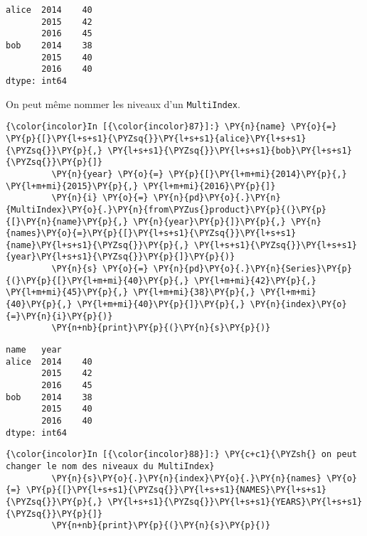     \begin{Verbatim}[commandchars=\\\{\},frame=single,framerule=0.3mm,rulecolor=\color{cellframecolor}]
alice  2014    40
       2015    42
       2016    45
bob    2014    38
       2015    40
       2016    40
dtype: int64
\end{Verbatim}

    On peut même nommer les niveaux d'un \texttt{MultiIndex}.

    \begin{Verbatim}[commandchars=\\\{\},frame=single,framerule=0.3mm,rulecolor=\color{cellframecolor}]
{\color{incolor}In [{\color{incolor}87}]:} \PY{n}{name} \PY{o}{=} \PY{p}{[}\PY{l+s+s1}{\PYZsq{}}\PY{l+s+s1}{alice}\PY{l+s+s1}{\PYZsq{}}\PY{p}{,} \PY{l+s+s1}{\PYZsq{}}\PY{l+s+s1}{bob}\PY{l+s+s1}{\PYZsq{}}\PY{p}{]}
         \PY{n}{year} \PY{o}{=} \PY{p}{[}\PY{l+m+mi}{2014}\PY{p}{,} \PY{l+m+mi}{2015}\PY{p}{,} \PY{l+m+mi}{2016}\PY{p}{]}
         \PY{n}{i} \PY{o}{=} \PY{n}{pd}\PY{o}{.}\PY{n}{MultiIndex}\PY{o}{.}\PY{n}{from\PYZus{}product}\PY{p}{(}\PY{p}{[}\PY{n}{name}\PY{p}{,} \PY{n}{year}\PY{p}{]}\PY{p}{,} \PY{n}{names}\PY{o}{=}\PY{p}{[}\PY{l+s+s1}{\PYZsq{}}\PY{l+s+s1}{name}\PY{l+s+s1}{\PYZsq{}}\PY{p}{,} \PY{l+s+s1}{\PYZsq{}}\PY{l+s+s1}{year}\PY{l+s+s1}{\PYZsq{}}\PY{p}{]}\PY{p}{)}
         \PY{n}{s} \PY{o}{=} \PY{n}{pd}\PY{o}{.}\PY{n}{Series}\PY{p}{(}\PY{p}{[}\PY{l+m+mi}{40}\PY{p}{,} \PY{l+m+mi}{42}\PY{p}{,} \PY{l+m+mi}{45}\PY{p}{,} \PY{l+m+mi}{38}\PY{p}{,} \PY{l+m+mi}{40}\PY{p}{,} \PY{l+m+mi}{40}\PY{p}{]}\PY{p}{,} \PY{n}{index}\PY{o}{=}\PY{n}{i}\PY{p}{)}
         \PY{n+nb}{print}\PY{p}{(}\PY{n}{s}\PY{p}{)}
\end{Verbatim}


    \begin{Verbatim}[commandchars=\\\{\},frame=single,framerule=0.3mm,rulecolor=\color{cellframecolor}]
name   year
alice  2014    40
       2015    42
       2016    45
bob    2014    38
       2015    40
       2016    40
dtype: int64
\end{Verbatim}

    \begin{Verbatim}[commandchars=\\\{\},frame=single,framerule=0.3mm,rulecolor=\color{cellframecolor}]
{\color{incolor}In [{\color{incolor}88}]:} \PY{c+c1}{\PYZsh{} on peut changer le nom des niveaux du MultiIndex}
         \PY{n}{s}\PY{o}{.}\PY{n}{index}\PY{o}{.}\PY{n}{names} \PY{o}{=} \PY{p}{[}\PY{l+s+s1}{\PYZsq{}}\PY{l+s+s1}{NAMES}\PY{l+s+s1}{\PYZsq{}}\PY{p}{,} \PY{l+s+s1}{\PYZsq{}}\PY{l+s+s1}{YEARS}\PY{l+s+s1}{\PYZsq{}}\PY{p}{]}
         \PY{n+nb}{print}\PY{p}{(}\PY{n}{s}\PY{p}{)}
\end{Verbatim}


